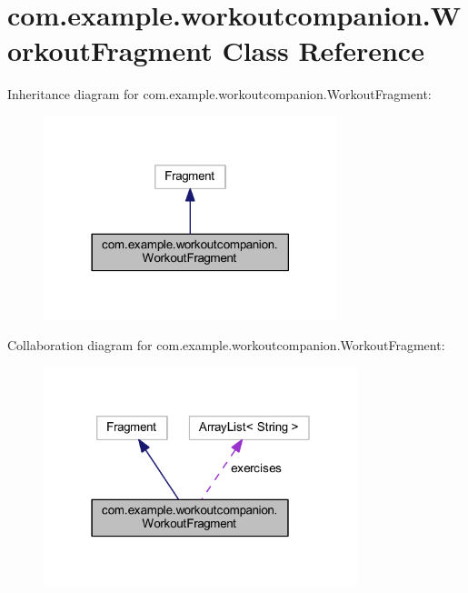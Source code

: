 \hypertarget{classcom_1_1example_1_1workoutcompanion_1_1_workout_fragment}{\section{com.\-example.\-workoutcompanion.\-Workout\-Fragment Class Reference}
\label{classcom_1_1example_1_1workoutcompanion_1_1_workout_fragment}
}


Inheritance diagram for com.\-example.\-workoutcompanion.\-Workout\-Fragment\-:
\nopagebreak
\begin{figure}[H]
\begin{center}
\leavevmode
\includegraphics[width=242pt]{classcom_1_1example_1_1workoutcompanion_1_1_workout_fragment__inherit__graph}
\end{center}
\end{figure}


Collaboration diagram for com.\-example.\-workoutcompanion.\-Workout\-Fragment\-:
\nopagebreak
\begin{figure}[H]
\begin{center}
\leavevmode
\includegraphics[width=259pt]{classcom_1_1example_1_1workoutcompanion_1_1_workout_fragment__coll__graph}
\end{center}
\end{figure}
